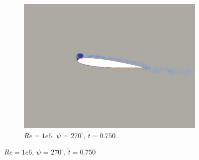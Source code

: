 \begin{figure}[H]
\begin{subfigure}[b]{0.32\textwidth}
		\centering
		\includegraphics[width=1\textwidth]{figures/Vorticity_plots/Re_1m_1pt0/phase_270.png}
		\caption{$Re=1e6$, $\psi$ = $270^\circ$, $\tilde{t}=0.750$}
		\label{fig:Re_1m_1pt0_phi270}
	\end{subfigure}
	

\end{figure}
